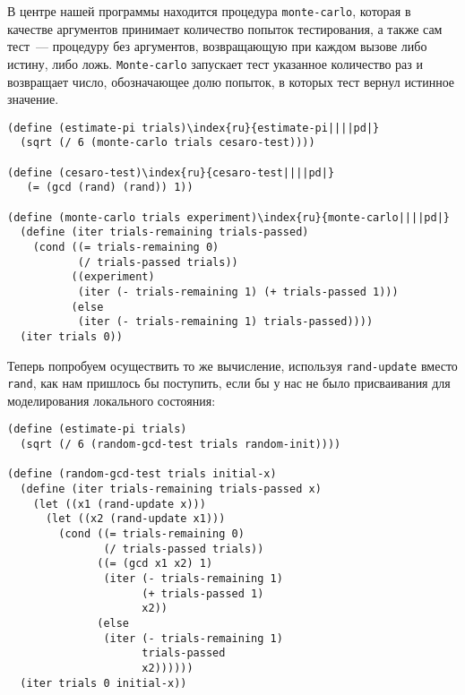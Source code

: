 В центре нашей программы находится процедура
{\tt monte-carlo}, которая в качестве аргументов принимает
количество попыток тестирования, а также сам тест~---
процедуру без аргументов, возвращающую при каждом
вызове либо истину, либо ложь.  {\tt Monte-carlo} запускает
тест указанное количество раз и возвращает число, обозначающее долю
попыток, в которых тест вернул истинное значение.

\begin{Verbatim}[fontsize=\small]
(define (estimate-pi trials)\index{ru}{estimate-pi||||pd|}
  (sqrt (/ 6 (monte-carlo trials cesaro-test))))

(define (cesaro-test)\index{ru}{cesaro-test||||pd|}
   (= (gcd (rand) (rand)) 1))

(define (monte-carlo trials experiment)\index{ru}{monte-carlo||||pd|}
  (define (iter trials-remaining trials-passed)
    (cond ((= trials-remaining 0)
           (/ trials-passed trials))
          ((experiment)
           (iter (- trials-remaining 1) (+ trials-passed 1)))
          (else
           (iter (- trials-remaining 1) trials-passed))))
  (iter trials 0))
\end{Verbatim}

Теперь попробуем осуществить то же вычисление, используя
{\tt rand-update} вместо {\tt rand}, как нам
пришлось бы поступить, если бы у нас не было присваивания для
моделирования локального состояния:

\begin{Verbatim}[fontsize=\small]
(define (estimate-pi trials)
  (sqrt (/ 6 (random-gcd-test trials random-init))))

(define (random-gcd-test trials initial-x)
  (define (iter trials-remaining trials-passed x)
    (let ((x1 (rand-update x)))
      (let ((x2 (rand-update x1)))
        (cond ((= trials-remaining 0)
               (/ trials-passed trials))
              ((= (gcd x1 x2) 1)
               (iter (- trials-remaining 1)
                     (+ trials-passed 1)
                     x2))
              (else
               (iter (- trials-remaining 1)
                     trials-passed
                     x2))))))
  (iter trials 0 initial-x))
\end{Verbatim}

